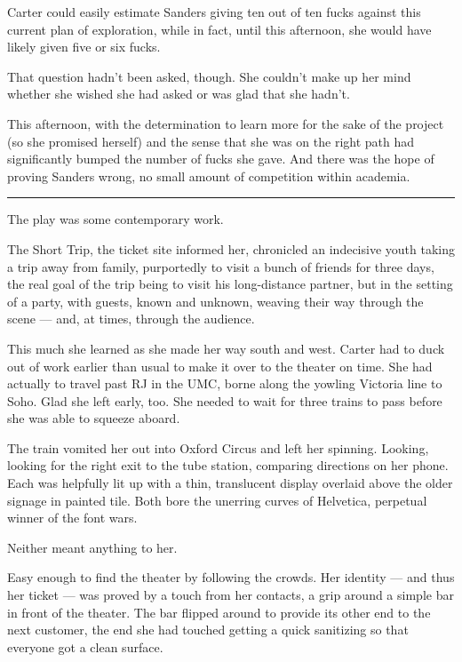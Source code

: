 Carter could easily estimate Sanders giving ten out of ten fucks against this current plan of exploration, while in fact, until this afternoon, she would have likely given five or six fucks.

That question hadn't been asked, though. She couldn't make up her mind whether she wished she had asked or was glad that she hadn't.

This afternoon, with the determination to learn more for the sake of the project (so she promised herself) and the sense that she was on the right path had significantly bumped the number of fucks she gave. And there was the hope of proving Sanders wrong, no small amount of competition within academia.

\begin{center}\rule{0.5\linewidth}{0.5pt}\end{center}

The play was some contemporary work.

The Short Trip, the ticket site informed her, chronicled an indecisive youth taking a trip away from family, purportedly to visit a bunch of friends for three days, the real goal of the trip being to visit his long-distance partner, but in the setting of a party, with guests, known and unknown, weaving their way through the scene — and, at times, through the audience.

This much she learned as she made her way south and west. Carter had to duck out of work earlier than usual to make it over to the theater on time. She had actually to travel past RJ in the UMC, borne along the yowling Victoria line to Soho. Glad she left early, too. She needed to wait for three trains to pass before she was able to squeeze aboard.

The train vomited her out into Oxford Circus and left her spinning. Looking, looking for the right exit to the tube station, comparing directions on her phone. Each was helpfully lit up with a thin, translucent display overlaid above the older signage in painted tile. Both bore the unerring curves of Helvetica, perpetual winner of the font wars.

Neither meant anything to her.

Easy enough to find the theater by following the crowds. Her identity — and thus her ticket — was proved by a touch from her contacts, a grip around a simple bar in front of the theater. The bar flipped around to provide its other end to the next customer, the end she had touched getting a quick sanitizing so that everyone got a clean surface.

